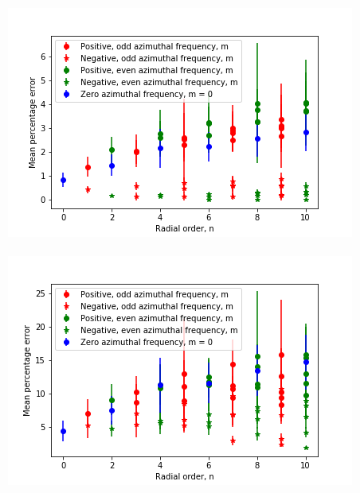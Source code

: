 \begin{figure}[h]
	\centering
	\begin{subfigure}{0.48\textwidth}
		\centering
		\includegraphics[width=\linewidth]{images/Zernike_fitting_percentage_error_random_modes_repeat_resize_factor_1_order_radial_azimuthal.png}
		\caption{}
		\label{fig:Zernike_fitting_percentage_error_random_modes_repeat_resize_factor_1}
	\end{subfigure}
	\begin{subfigure}{0.48\textwidth}
		\centering
		\includegraphics[width=\linewidth]{images/Zernike_fitting_percentage_error_random_modes_repeat_resize_factor_2_order_radial_azimuthal.png}
		\caption{}
		\label{fig:Zernike_fitting_percentage_error_random_modes_repeat_resize_factor_2}
	\end{subfigure}
	

\end{figure}
